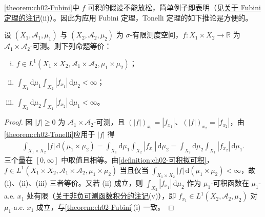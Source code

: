 \documentclass[../../main.tex]{subfiles}%
\begin{document}
\cref{theorem:ch02-Fubini}中 $f$ 可积的假设不能放松，简单例子即表明（见\hyperref[remark:ch02-Fubini动机]{关于 Fubini 定理的注记}(ii)）。因此为应用 Fubini 定理，Tonelli 定理的如下推论是方便的。

\begin{theorem}\label{theorem:ch02-Fubini判别}
设 $(X_1,\mathscr A_1,\mu_1)$ 与 $(X_2,\mathscr A_2,\mu_2)$ 为 $\sigma$-有限测度空间，$f:X_1\times X_2\to\mathbb R$ 为 $\mathscr A_1\times\mathscr A_2$-可测。则下列命题等价：
\begin{enumerate}[(i)]
\item $f\in L^1(X_1\times X_2,\mathscr A_1\times\mathscr A_2,\mu_1\times\mu_2)$；
\item $\int_{X_1}\mathrm{d}\mu_1\int_{X_2}|f_{x_1}|\,\mathrm{d}\mu_2<\infty$；
\item $\int_{X_2}\mathrm{d}\mu_2\int_{X_1}|f_{x_2}|\,\mathrm{d}\mu_1<\infty$。
\end{enumerate}
\end{theorem}

\begin{proof}
因 $|f|\geqslant0$ 为 $\mathscr A_1\times\mathscr A_2$-可测，且 $(|f|)_{x_1}=|f_{x_1}|$、$(|f|)_{x_2}=|f_{x_2}|$，由\cref{theorem:ch02-Tonelli}应用于 $|f|$ 得
\begin{align*}
\int_{X_1\times X_2}|f|\,\mathrm{d}(\mu_1\times\mu_2)
=\int_{X_1}\mathrm{d}\mu_1\int_{X_2}|f_{x_1}|\,\mathrm{d}\mu_2
=\int_{X_2}\mathrm{d}\mu_2\int_{X_1}|f_{x_2}|\,\mathrm{d}\mu_1.
\end{align*}
三个量在 $[0,\infty]$ 中取值且相等。由\cref{definition:ch02-可积拟可积}，$f\in L^1(X_1\times X_2,\mathscr A_1\times\mathscr A_2,\mu_1\times\mu_2)$ 当且仅当 $\int_{X_1\times X_2}|f|\,\mathrm{d}(\mu_1\times\mu_2)<\infty$，故 (i)、(ii)、(iii) 三者等价。又若 (ii) 成立，则 $\int_{X_2}|f_{x_1}|\,\mathrm{d}\mu_2$ 作为 $\mu_1$-可积函数在 $\mu_1$-a.e. $x_1$ 处有限（\hyperref[remark:ch02-非负可测积分动机]{关于非负可测函数积分的注记}(v)），即 $f_{x_1}\in L^1(X_2,\mathscr A_2,\mu_2)$ 对 $\mu_1$-a.e. $x_1$ 成立，与\cref{theorem:ch02-Fubini}(i) 一致。
\end{proof}
\end{document}

